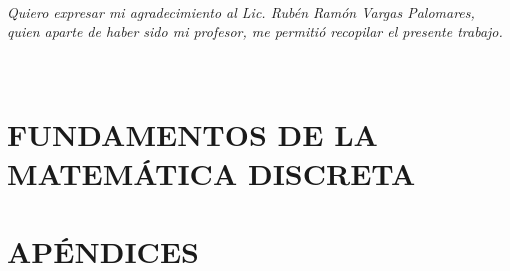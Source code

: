 \documentclass[letterpaper]{book}
\newlength\esp
\newcommand{\thechapterimage}{}
\newcommand{\chapterimage}[1]{\renewcommand{\thechapterimage}{#1}}
\newcommand{\thechapterspaceabove}{}
\newcommand{\chapterspaceabove}[1]{\renewcommand{\thechapterspaceabove}{#1}}
\newcommand{\thechapterspacebelow}{}
\newcommand{\chapterspacebelow}[1]{\renewcommand{\thechapterspacebelow}{#1}}
\theoremstyle{myplain}
\begin{document}
\pagestyle{empty}



\newpage

~\vfill\hfill\begin{minipage}[l]{0.55\textwidth}
     \itshape Quiero expresar mi agradecimiento al Lic. Rubén Ramón Vargas Palomares, quien aparte de haber sido mi profesor, me permitió recopilar el presente trabajo.
\end{minipage}

\newpage
\,

\chapterimage{blue20.jpeg} %
\chapterspaceabove{6.75cm} %
\chapterspacebelow{7.25cm} %

\renewcommand{\contentsname}{CONTENIDO}
\tableofcontents
\label{toc-contents}




\part[\vspace{-0.13cm}FUNDAMENTOS DE LA MATEMÁTICA DISCRETA]{FUNDAMENTOS DE LA MATEMÁTICA DISCRETA}

\pagestyle{fancy}

















\part*{\vspace{-0.13cm}APÉNDICES}

\appendix






\end{document}
